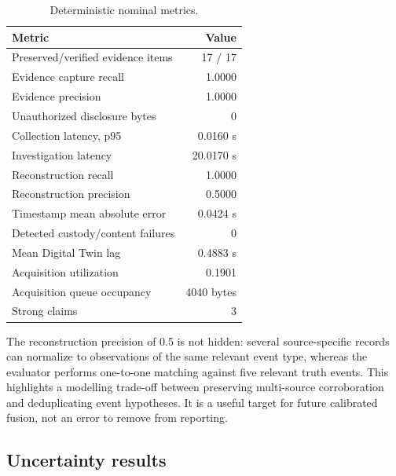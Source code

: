 ﻿\documentclass[11pt,a4paper]{article}
\begin{document}
\begin{table}[H]
\centering
\caption{Deterministic nominal metrics.}
\label{tab:nominal}
\begin{tabular}{@{}l r@{}}
\toprule
Metric & Value \\
\midrule
Preserved/verified evidence items & 17 / 17 \\
Evidence capture recall & 1.0000 \\
Evidence precision & 1.0000 \\
Unauthorized disclosure bytes & 0 \\
Collection latency, p95 & 0.0160 s \\
Investigation latency & 20.0170 s \\
Reconstruction recall & 1.0000 \\
Reconstruction precision & 0.5000 \\
Timestamp mean absolute error & 0.0424 s \\
Detected custody/content failures & 0 \\
Mean Digital Twin lag & 0.4883 s \\
Acquisition utilization & 0.1901 \\
Acquisition queue occupancy & 4040 bytes \\
Strong claims & 3 \\
\bottomrule
\end{tabular}
\end{table}

The reconstruction precision of 0.5 is not hidden: several source-specific records can normalize to observations of the same relevant event type, whereas the evaluator performs one-to-one matching against five relevant truth events. This highlights a modelling trade-off between preserving multi-source corroboration and deduplicating event hypotheses. It is a useful target for future calibrated fusion, not an error to remove from reporting.

\subsection{Uncertainty results}
\end{document}

